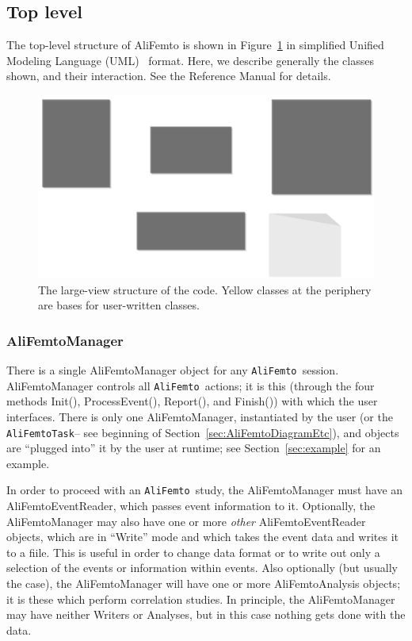 \documentclass[twoside]{article}
\newcommand{\name}[1]{\textsf{#1}}%
\newcommand{\meth}[1]{\textsf{#1}}%
\newcommand{\AliFemto}{{\tt AliFemto }}
\begin{document}
\subsection{Top level}
\label{sec:topLevel}
The top-level structure of AliFemto is shown in Figure~\ref{fig:TopLevelUML} in simplified Unified Modeling Language (UML)~\cite{UMLreference} format.
Here, we describe generally the classes shown, and their interaction.  See the Reference Manual for details.

\begin{figure}[t]
\includegraphics[width=\textwidth]{TopLevelUML.pdf}
\caption{The large-view structure of the code.  
Yellow classes at the periphery are bases for user-written
classes.\label{fig:TopLevelUML}
}
\end{figure}


\subsubsection{AliFemtoManager}

There is a single \name{AliFemtoManager} object for any \AliFemto session.
\name{AliFemtoManager} controls all \AliFemto actions; it is this (through
the four methods \meth{Init()}, \meth{ProcessEvent()}, \meth{Report()}, and \meth{Finish()}) with which the user 
interfaces.
There is only one AliFemtoManager, instantiated by the user (or the {\tt AliFemtoTask}-- see beginning of
Section~\ref{sec:AliFemtoDiagramEtc}), and objects are ``plugged into'' it by the user at runtime;
see Section~\ref{sec:example} for an example.

In order to proceed with an \AliFemto study, the \name{AliFemtoManager} must have an \name{AliFemtoEventReader}, which passes event information
to it.  Optionally, the \name{AliFemtoManager} may also have one or more {\it other} \name{AliFemtoEventReader}
objects, which are in ``Write'' mode and
which takes the event data and writes it to a fiile.  This is useful in order to change data format or to write out only a selection
of the events or information within events.  Also optionally (but usually the case), the \name{AliFemtoManager} will have one or more
\name{AliFemtoAnalysis}
objects; it is these which perform correlation studies.  In principle, the \name{AliFemtoManager} may have neither Writers or Analyses, but
in this case nothing gets done with the data.
\end{document}
